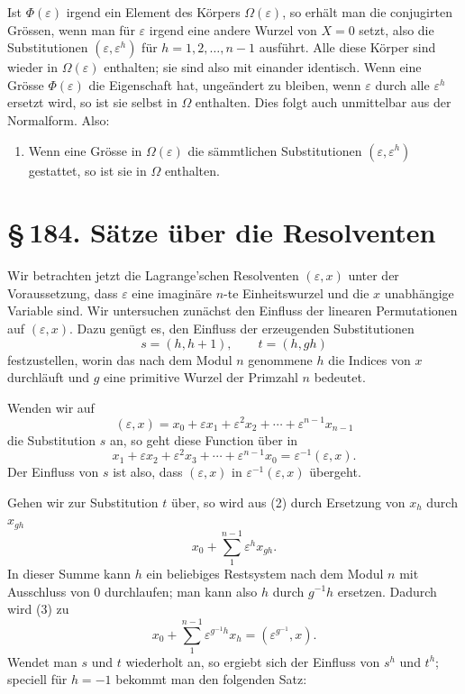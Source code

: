\documentclass[11pt]{article}
\providecommand{\sect}[2]{\section*{\S\,#1. #2}}
\begin{document}
Ist $\Phi(\varepsilon)$ irgend ein Element des K\"orpers $\Omega(\varepsilon)$, so erh\"alt man die conjugirten Gr\"ossen, wenn man f\"ur $\varepsilon$ irgend eine andere Wurzel von $X=0$ setzt, also die Substitutionen $(\varepsilon,\varepsilon^h)$ f\"ur $h=1,2,\ldots,n-1$ ausf\"uhrt. Alle diese K\"orper sind wieder in $\Omega(\varepsilon)$ enthalten; sie sind also mit einander identisch. Wenn eine Gr\"osse $\Phi(\varepsilon)$ die Eigenschaft hat, unge\"andert zu bleiben, wenn $\varepsilon$ durch alle $\varepsilon^h$ ersetzt wird, so ist sie selbst in $\Omega$ enthalten. Dies folgt auch unmittelbar aus der Normalform. Also:

\begin{enumerate}[resume,label=\arabic*.]
\item Wenn eine Gr\"osse in $\Omega(\varepsilon)$ die s\"ammtlichen Substitutionen $(\varepsilon,\varepsilon^h)$ gestattet, so ist sie in $\Omega$ enthalten.
\end{enumerate}

\sect{184}{S\"atze \"uber die Resolventen}

Wir betrachten jetzt die Lagrange'schen Resolventen $(\varepsilon,x)$ unter der Voraussetzung, dass $\varepsilon$ eine imagin\"are $n$-te Einheitswurzel und die $x$ unabh\"angige Variable sind. Wir untersuchen zun\"achst den Einfluss der linearen Permutationen auf $(\varepsilon,x)$. Dazu gen\"ugt es, den Einfluss der erzeugenden Substitutionen
\begin{equation}\tag{1}
  s=(h,h+1),\qquad t=(h,gh)
\end{equation}
festzustellen, worin das nach dem Modul $n$ genommene $h$ die Indices von $x$ durchl\"auft und $g$ eine primitive Wurzel der Primzahl $n$ bedeutet.

Wenden wir auf
\begin{equation}\tag{2}
  (\varepsilon,x)=x_0+\varepsilon x_1+\varepsilon^2x_2+\cdots+\varepsilon^{n-1}x_{n-1}
\end{equation}
die Substitution $s$ an, so geht diese Function \"uber in
\[
  x_1+\varepsilon x_2+\varepsilon^2x_3+\cdots+\varepsilon^{n-1}x_0
  =\varepsilon^{-1}(\varepsilon,x).
\]
Der Einfluss von $s$ ist also, dass $(\varepsilon,x)$ in $\varepsilon^{-1}(\varepsilon,x)$ \"ubergeht.

Gehen wir zur Substitution $t$ \"uber, so wird aus (2) durch Ersetzung von $x_h$ durch $x_{gh}$
\begin{equation}\tag{3}
  x_0+\sum_{1}^{n-1}\varepsilon^h x_{gh}.
\end{equation}
In dieser Summe kann $h$ ein beliebiges Restsystem nach dem Modul $n$ mit Ausschluss von $0$ durchlaufen; man kann also $h$ durch $g^{-1}h$ ersetzen. Dadurch wird (3) zu
\[
  x_0+\sum_{1}^{n-1}\varepsilon^{g^{-1}h}x_h=(\varepsilon^{g^{-1}},x).
\]
Wendet man $s$ und $t$ wiederholt an, so ergiebt sich der Einfluss von $s^h$ und $t^h$; speciell f\"ur $h=-1$ bekommt man den folgenden Satz:
\end{document}
